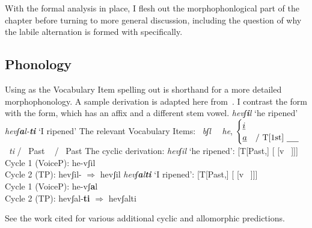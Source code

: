 With the formal analysis in place, I flesh out the morphophonlogical part of the chapter before turning to more general discussion, including the question of why the labile alternation is formed with {\vd} specifically.

	
	\subsection{Phonology} \label{vd:vd:phono}
Using {\thit} as the Vocabulary Item spelling out {\vd} is shorthand for a more detailed morphophonology. A sample derivation is adapted here from~\cite{kastner18nllt}. I contrast the  form with the  form, which has an affix and a different stem vowel.
\pex
	\a \emph{hevʃ\textbf{i}l} `he ripened'
	\a \emph{hevʃ\textbf{a}l-\textbf{ti}} `I ripened'
\xe
The relevant Vocabulary Items:
\pex
	\a {} \lra~\emph{bʃl}
	\a 	\vd~\lra~\emph{he}, $\begin{cases}
			\emph{i}\\
			\emph{a} & \text{/ T[1st] \trace}
			\end{cases}$
	 \lra~\emph{ti} / \trace~Past
	\a {} \lra~{\zero} / \trace~Past
\xe
The cyclic derivation:
\pex
	\a \emph{hevʃil} `he ripened': [T[Past,] [{\vd} [v ~\!]]]\\
	Cycle 1 (VoiceP): he-vʃil\\
	Cycle 2 (TP): hevʃil-{\zero} $\Rightarrow$ hevʃil
	\a \emph{hevʃ\textbf{a}l\textbf{ti}} `I ripened': [T[Past,] [{\vd} [v ~\!]]] \\
	Cycle 1 (VoiceP): he-vʃ\textbf{a}l\\
	Cycle 2 (TP): hevʃal-\textbf{ti} $\Rightarrow$ hevʃalti
\xe	

See the work cited for various additional cyclic and allomorphic predictions.

		


